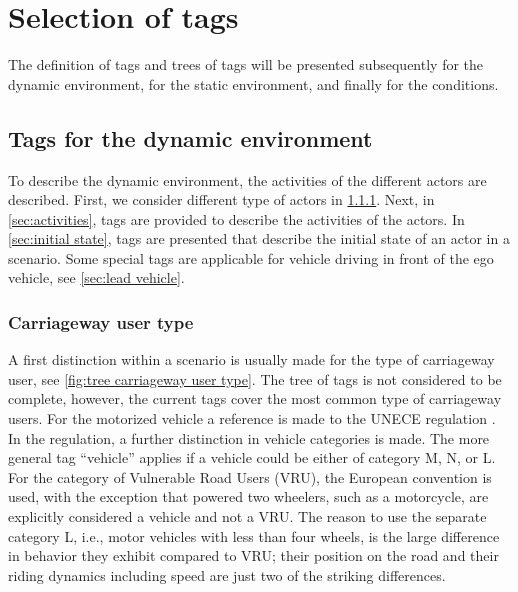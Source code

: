 \section{Selection of tags}
\label{sec:tags}

The definition of tags and trees of tags will be presented subsequently for the dynamic environment, for the static environment, and finally for the conditions.



\subsection{Tags for the dynamic environment}
\label{sec:selection of tags dynamic}

To describe the dynamic environment, the activities of the different actors are described. First, we consider different type of actors in \cref{sec:type of actor}. Next, in \cref{sec:activities}, tags are provided to describe the activities of the actors. In \cref{sec:initial state}, tags are presented that describe the initial state of an actor in a scenario. Some special tags are applicable for vehicle driving in front of the ego vehicle, see \cref{sec:lead vehicle}. %



\subsubsection{Carriageway user type}
\label{sec:type of actor}

A first distinction within a scenario is usually made for the type of carriageway user, see \cref{fig:tree carriageway user type}. The tree of tags is not considered to be complete, however, the current tags cover the most common type of carriageway users. For the motorized vehicle a reference is made to the UNECE regulation \autocite{UNECE2011consolidated}. In the regulation, a further distinction in vehicle categories is made. The more general tag ``vehicle'' applies if a vehicle could be either of category M, N, or L. For the category of Vulnerable Road Users (VRU), the European convention is used, with the exception that powered two wheelers, such as a motorcycle, are explicitly considered a vehicle and not a VRU. The reason to use the separate category L, i.e., motor vehicles with less than four wheels, is the large difference in behavior they exhibit compared to VRU; their position on the road and their riding dynamics including speed are just two of the striking differences. 

